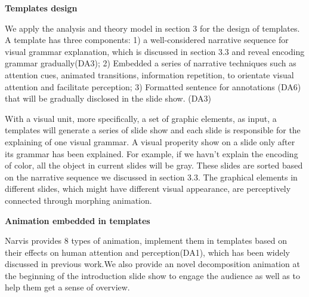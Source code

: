 \textbf{Templates design}

We apply the analysis and theory model in section 3 for the design of templates. A template has three components: 1) a well-considered narrative sequence for visual grammar explanation, which  is discussed in section 3.3 and reveal encoding grammar gradually(DA3); 2) Embedded a series of narrative techniques such as attention cues, animated transitions, information repetition, to orientate visual attention and facilitate perception; 3) Formatted sentence for annotations (DA6) that will be gradually disclosed in the slide show. (DA3)

With a visual unit, more specifically, a set of graphic elements, as input, a templates will generate a series of slide show and each slide is responsible for the explaining of one visual grammar. A visual properity show on a slide only after its grammar has been explained. For example, if we havn't explain the encoding of color, all the object in current slides will be gray. These slides are sorted based on the narrative sequence we discussed in section 3.3. The graphical elements in different slides, which might have different visual appearance, are perceptively connected through morphing animation.

\textbf{Animation embedded in templates }

Narvis provides 8 types of animation, implement them in templates based on their effects on human attention and perception(DA1), which has been widely discussed in previous work.\cite{robertson_effectiveness_2008, waldner_attractive_2014, heer_animated_2007}We also provide an novel decomposition animation at the beginning of the introduction slide show to engage the audience as well as to help them get a sense of overview.


